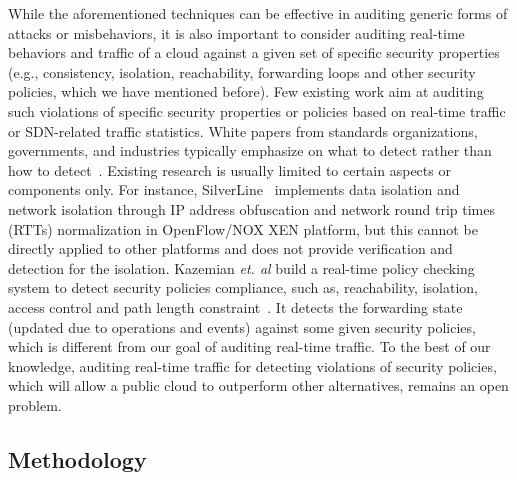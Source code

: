 \documentclass[12pt]{article}
\begin{document}
While the aforementioned techniques can be effective in auditing
generic forms of attacks or misbehaviors, it is also important to
consider auditing real-time behaviors and traffic of a cloud against a
given set of specific security properties (e.g., consistency,
isolation, reachability, forwarding loops and other security policies,
which we have mentioned before). Few existing work aim at auditing
such violations of specific security properties or policies based on
real-time traffic or SDN-related traffic statistics. White papers from
standards organizations, governments, and industries typically
emphasize on what to detect rather than how to detect~\cite{DenmarkWP,
  CSCCWP, singaporeWP}. Existing research is usually limited to
certain aspects or components only. For instance,
SilverLine~\cite{Mundada:2011:SDN:2170444.2170457} implements data
isolation and network isolation through IP address obfuscation and
network round trip times (RTTs) normalization in OpenFlow/NOX XEN
platform, but this cannot be directly applied to other platforms and
does not provide verification and detection for the
isolation. Kazemian \emph{et. al} build a real-time policy checking
system to detect security policies compliance, such as, reachability,
isolation, access control and path length
constraint~\cite{Kazemian:2013:RTN:2482626.2482638}. It detects the
forwarding state (updated due to operations and events) against some
given security policies, which is different from our goal of auditing
real-time traffic. To the best of our knowledge, auditing real-time
traffic for detecting violations of security policies, which will
allow a public cloud to outperform other alternatives, remains
an open problem.












\vspace{-3mm}
\subsection{Methodology}
\label{sec:research}
\vspace{-2mm} 
\end{document}
